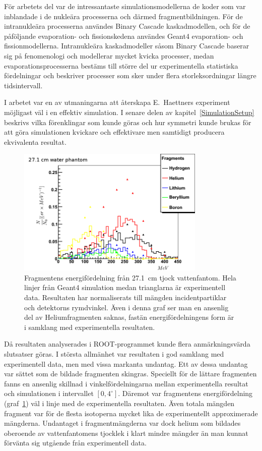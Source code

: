 För arbetets del var de intressantaste simulationsmodellerna de koder som var inblandade i de nukleära processerna och därmed fragmentbildningen. För de intranukleära processerna användes Binary Cascade kaskadmodellen, och för de påföljande evaporation- och fissionskedena användes Geant4 evaporation- och fissionmodellerna. Intranukleära kaskadmodeller såsom Binary Cascade baserar sig på fenomenologi och modellerar mycket kvicka processer, medan evaporationsprocesserna bestäms till större del ur experimentella statistiska fördelningar och beskriver processer som sker under flera storleksordningar längre tidsintervall.

I arbetet var en av utmaningarna att återskapa E.~Haettners experiment möjligast väl i en effektiv simulation. I senare delen av kapitel~\ref{SimulationSetup} beskrivs vilka förenklingar som kunde göras och hur symmetri kunde brukas för att göra simulationen kvickare och effektivare men samtidigt producera ekvivalenta resultat.
\begin{figure}[!h] 
\begin{center}
\includegraphics[width=0.8\textwidth]{images/plots/fragmentEnergy/fragmentEnergyDistr.png}  
\caption{\label{fragmentEnergySvenska}Fragmentens energifördelning från 27.1~cm tjock vattenfantom. Hela linjer från Geant4 simulation medan trianglarna är experimentell data. Resultaten har normaliserats till mängden incidentpartiklar och detektorns rymdvinkel. Även i denna graf ser man en ansenlig del av Heliumfragmenten saknas, fastän energifördelningens form är i samklang med experimentella resultaten.}
\end{center}
\end{figure}

Då resultaten analyserades i ROOT-programmet kunde flera anmärkningsvärda slutsatser göras. I största allmänhet var resultaten i god samklang med experimentell data, men med vissa markanta undantag. Ett av dessa undantag var sättet som de bildade fragmenten skingras. Speciellt för de lättare fragmenten fanns en ansenlig skillnad i vinkelfördelningarna mellan experimentella resultat och simulationen i intervallet $[0,4^\circ]$. Däremot var fragmentens energifördelning (graf~\ref{fragmentEnergySvenska}) väl i linje med de experimentella resultaten. Även totala mängden fragment var för de flesta isotoperna mycket lika de experimentellt approximerade mängderna. Undantaget i fragmentmängderna var dock helium som bildades oberoende av vattenfantomens tjocklek i klart mindre mängder än man kunnat förvänta sig utgående från experimentell data.

